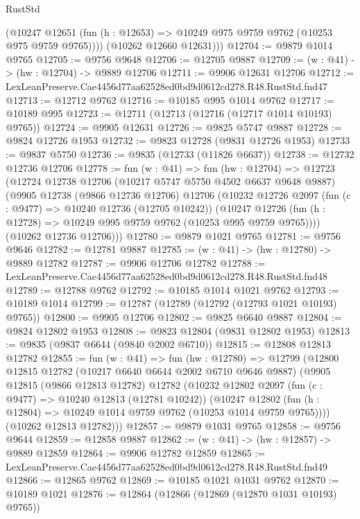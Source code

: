 \begin{lexlean}{RustStd}
\begin{coremodule}
          (@10247 @12651 (fun (h : @12653) => @10249 @975 @9759 @9762 (@10253 @975 @9759 @9765))))
        (@10262 @12660 @12631)))
@12704 := @9879 @1014 @9765
@12705 := @9756 @9648
@12706 := @12705 @9887
@12709 := (w : @41) -> (hw : @12704) -> @9889 @12706
@12711 := @9906 @12631 @12706
@12712 := LexLeanPreserve.Cae4456d77aa62528ed0bd9d0612cd278.R48.RustStd.fnd47
@12713 := @12712 @9762
@12716 := @10185 @995 @1014 @9762
@12717 := @10189 @995
@12723 := @12711 (@12713 (@12716 (@12717 @1014 @10193) @9765))
@12724 := @9905 @12631
@12726 := @9825 @5747 @9887
@12728 := @9824 @12726 @1953
@12732 := @9823 @12728 (@9831 @12726 @1953)
@12733 := @9837 @5750
@12736 := @9835 (@12733 (@11826 @6637))
@12738 := @12732 @12736 @12706
@12778 := fun (w : @41) =>
  fun (hw : @12704) =>
  @12723
    (@12724
      @12738
      @12706
      (@10217 @5747 @5750 @4502 @6637 @9648 @9887)
      (@9905
        @12738
        (@9866 @12736 @12706)
        @12706
        (@10232
          @12726
          @2097
          (fun (c : @9477) => @10240 @12736 (@12705 @10242))
          (@10247 @12726 (fun (h : @12728) => @10249 @995 @9759 @9762 (@10253 @995 @9759 @9765))))
        (@10262 @12736 @12706)))
@12780 := @9879 @1021 @9765
@12781 := @9756 @9646
@12782 := @12781 @9887
@12785 := (w : @41) -> (hw : @12780) -> @9889 @12782
@12787 := @9906 @12706 @12782
@12788 := LexLeanPreserve.Cae4456d77aa62528ed0bd9d0612cd278.R48.RustStd.fnd48
@12789 := @12788 @9762
@12792 := @10185 @1014 @1021 @9762
@12793 := @10189 @1014
@12799 := @12787 (@12789 (@12792 (@12793 @1021 @10193) @9765))
@12800 := @9905 @12706
@12802 := @9825 @6640 @9887
@12804 := @9824 @12802 @1953
@12808 := @9823 @12804 (@9831 @12802 @1953)
@12813 := @9835 (@9837 @6644 (@9840 @2002 @6710))
@12815 := @12808 @12813 @12782
@12855 := fun (w : @41) =>
  fun (hw : @12780) =>
  @12799
    (@12800
      @12815
      @12782
      (@10217 @6640 @6644 @2002 @6710 @9646 @9887)
      (@9905
        @12815
        (@9866 @12813 @12782)
        @12782
        (@10232
          @12802
          @2097
          (fun (c : @9477) => @10240 @12813 (@12781 @10242))
          (@10247 @12802 (fun (h : @12804) => @10249 @1014 @9759 @9762 (@10253 @1014 @9759 @9765))))
        (@10262 @12813 @12782)))
@12857 := @9879 @1031 @9765
@12858 := @9756 @9644
@12859 := @12858 @9887
@12862 := (w : @41) -> (hw : @12857) -> @9889 @12859
@12864 := @9906 @12782 @12859
@12865 := LexLeanPreserve.Cae4456d77aa62528ed0bd9d0612cd278.R48.RustStd.fnd49
@12866 := @12865 @9762
@12869 := @10185 @1021 @1031 @9762
@12870 := @10189 @1021
@12876 := @12864 (@12866 (@12869 (@12870 @1031 @10193) @9765))

\end{coremodule}
\end{lexlean}
